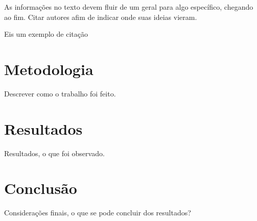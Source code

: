 \documentclass[12pt, a4paper]{article}
\begin{document}
As informações no texto devem fluir de um geral para algo específico, chegando ao fim. Citar autores afim de indicar onde suas ideias vieram.

Eis um exemplo de citação\cite[p. 215]{pressman}

\section{Metodologia}
Descrever como o trabalho foi feito.

\section{Resultados}
Resultados, o que foi observado.

\section{Conclusão}
Considerações finais, o que se pode concluir dos resultados?


\end{document}
